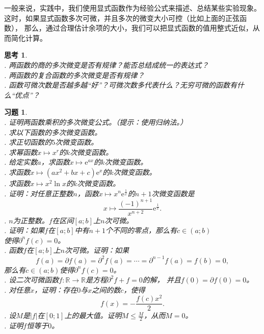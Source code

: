 \documentclass[12pt,UTF8]{ctexbook}
\theoremstyle{definition}
\theoremstyle{plain}
\newtheorem{sk}{思考}[section]
\newtheorem{xt}{习题}[section]
\begin{document}
一般来说，实践中，我们使用显式函数作为经验公式来描述、总结某些实验现象。
这时，如果显式函数多次可微，并且多次的微变大小可控（比如上面的正弦函数），
那么，通过合理估计余项的大小，我们可以把显式函数的值用整式近似，从而简化计算。

\begin{sk}
    \mbox{} \\
    . 两函数的商的多次微变是否有规律？能否总结成统一的表达式？\\
    . 两函数的复合函数的多次微变是否有规律？\\
    . 函数可微次数是否越多越“好”？可微次数多代表什么？无穷可微的函数有什么“优点”？
\end{sk}

\begin{xt}
    \mbox{} \\
    . 证明两函数乘积的多次微变公式。（提示：使用归纳法。）\\
    . 求以下函数的多次微变函数。\\
    . 求正切函数的$5$次微变函数。\\
    . 求幂函数$x\mapsto x^r$的$k$次微变函数。\\
    . 给定实数$a$，求函数$x\mapsto \mathrm{e}^{ax}$的$k$次微变函数。\\
    . 求函数$x \mapsto (ax^2 + bx + c)\mathrm{e}^x$的$k$次微变函数。\\
    . 求函数$x \mapsto x^2\ln{x}$的$k$次微变函数。\\
    . 证明：对任意正整数$n$，函数$x\mapsto x^n \mathrm{e}^{\frac{1}{x}}$的$n+1$次微变函数是
    $$x\mapsto \frac{(-1)^{n+1}}{x^{n+2}}\mathrm{e}^{\frac{1}{x}}.$$
    . $n$为正整数。$f$在区间$[a; b]$上$n$次可微。\\
    . 证明：如果$f$在$[a; b]$中有$n+1$个不同的零点，那么有$c\in(a; b)$\\
    \indent 使得$\partial^n f(c) = 0$。\\
    . 函数$f$在$[a; b]$上$n$次可微。证明：如果
    $$f(a) = \partial f(a) = \partial^2 f(a) = \cdots = \partial^{n-1} f(a) = f(b) = 0,$$
    \indent 那么有$c\in(a; b)$使得$\partial^n f(c) = 0$。\\
    . 设二次可微函数$f:\mathbb{R} \rightarrow \mathbb{R}$是方程$\partial^2 f + f = 0$的解，
    并且$f(0) = \partial f(0) = 0$。\\
    . 对任意$x$，证明：存在$0$与$x$之间的数$c$，使得
    $$ f(x) = -\frac{f(c)x^2}{2}. $$
    . 设$M$是$|f|$在$[0;1]$上的最大值。证明$M \leqslant \frac{M}{2}$，从而$M = 0$。\\
    . 证明$f$恒等于$0$。\\
\end{xt}
\end{document}
